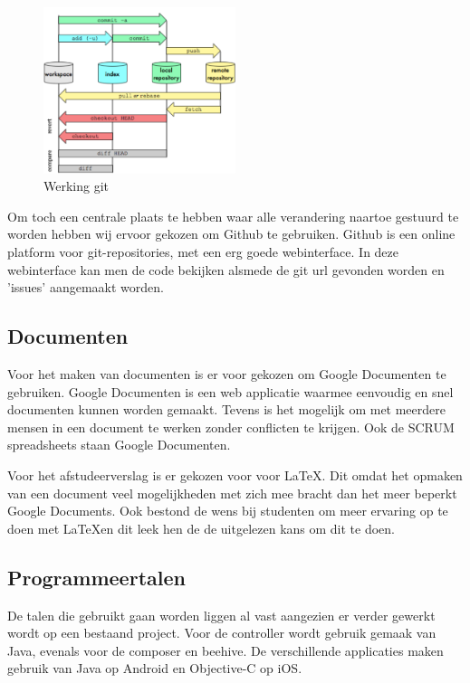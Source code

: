 \documentclass[]{article}
\begin{document}
\begin{figure}[htpb]
  \begin{center}
    \includegraphics[width=0.50\textwidth]{git_diagram.pdf}
  \end{center}
  \caption{Werking git}
  \label{git}
\end{figure}

Om toch een centrale plaats te hebben waar alle verandering naartoe
gestuurd te worden hebben wij ervoor gekozen om Github te gebruiken. Github
is een online platform voor git-repositories, met een erg goede
webinterface. In deze webinterface kan men de code bekijken alsmede de git url
gevonden worden en 'issues' aangemaakt worden.

\subsection{Documenten}
Voor het maken van documenten is er voor gekozen om Google Documenten te
gebruiken. Google Documenten is een web applicatie waarmee eenvoudig en
snel documenten kunnen worden gemaakt. Tevens is het mogelijk om met
meerdere mensen in een document te werken zonder conflicten te krijgen. Ook
de SCRUM spreadsheets staan Google Documenten.

Voor het afstudeerverslag is er gekozen voor voor \LaTeX. Dit omdat het opmaken
van een document veel mogelijkheden met zich mee bracht dan het meer
beperkt Google Documents. Ook bestond de wens bij studenten
om meer ervaring op te doen met \LaTeX\space en dit leek hen de de uitgelezen kans om
dit te doen.

\subsection{Programmeertalen}
De talen die gebruikt gaan worden liggen al vast aangezien er verder 
gewerkt wordt op een bestaand project. Voor de controller wordt gebruik gemaak van
Java, evenals voor de composer en beehive. De verschillende applicaties maken gebruik
van Java op Android en Objective-C op iOS.
\end{document}
